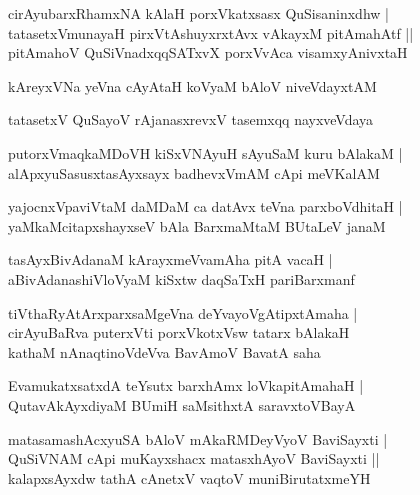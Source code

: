 \begin{shloka}
cirAyubarxRhamxNA kAlaH porxVkatxsasx QuSisaninxdhw |\\
tatasetxVmunayaH pirxVtAshuyxrxtAvx vAkayxM pitAmahAtf ||\\
pitAmahoV QuSiVnadxqqSATxvX porxVvAca visamxyAnivxtaH
\end{shloka}

\begin{shloka}
kAreyxVNa yeVna cAyAtaH koVyaM bAloV niveVdayxtAM
\end{shloka}

\begin{shloka}
tatasetxV QuSayoV rAjanasxrevxV tasemxqq nayxveVdaya\R
\end{shloka}

\begin{shloka}
putorxVmaqkaMDoVH kiSxVNAyuH sAyuSaM kuru bAlakaM |\\
alApxyuSasusxtasAyxsayx badhevxVmAM cApi meVKalAM
\end{shloka}

\begin{shloka}
yajocnxVpaviVtaM daMDaM ca datAvx teVna parxboVdhitaH |\\
yaMkaMcitapxshayxseV bAla BarxmaMtaM BUtaLeV janaM
\end{shloka}

\begin{shloka}
tasAyxBivAdanaM kArayxmeVvamAha pitA vacaH |\\
aBivAdanashiVloVyaM kiSxtw daqSaTxH pariBarxmanf
\end{shloka}

\begin{shloka}
tiVthaRyAtArxparxsaMgeVna deYvayoVgAtipxtAmaha |\\
cirAyuBaRva puterxVti porxVkotxVsw tatarx bAlakaH \\
kathaM nAnaqtinoVdeVva BavAmoV BavatA saha
\end{shloka}

\begin{shloka}
EvamukatxsatxdA teYsutx barxhAmx loVkapitAmahaH |\\
QutavAkAyxdiyaM BUmiH saMsithxtA saravxtoVBayA
\end{shloka}

\begin{shloka}
matasamashAcxyuSA bAloV mAkaRMDeyVyoV BaviSayxti |\\
QuSiVNAM cApi muKayxshacx matasxhAyoV BaviSayxti ||\\
kalapxsAyxdw tathA cAnetxV vaqtoV muniBirutatxmeYH
\end{shloka}

